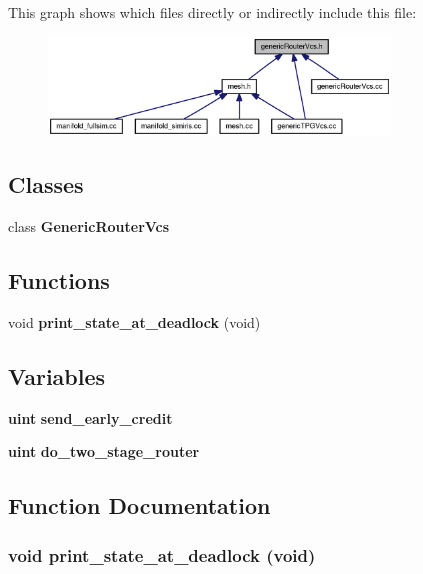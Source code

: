 This graph shows which files directly or indirectly include this file:\nopagebreak
\begin{figure}[H]
\begin{center}
\leavevmode
\includegraphics[width=257pt]{genericRouterVcs_8h__dep__incl}
\end{center}
\end{figure}
\subsection*{Classes}
\begin{CompactItemize}
\item 
class {\bf GenericRouterVcs}
\end{CompactItemize}
\subsection*{Functions}
\begin{CompactItemize}
\item 
void {\bf print\_\-state\_\-at\_\-deadlock} (void)
\end{CompactItemize}
\subsection*{Variables}
\begin{CompactItemize}
\item 
{\bf uint} {\bf send\_\-early\_\-credit}
\item 
{\bf uint} {\bf do\_\-two\_\-stage\_\-router}
\end{CompactItemize}


\subsection{Function Documentation}
\subsubsection[{print\_\-state\_\-at\_\-deadlock}]{\setlength{\rightskip}{0pt plus 5cm}void print\_\-state\_\-at\_\-deadlock (void)}\label{genericRouterVcs_8h_dd8eeaa0833d2f96796f0ee0f0e98f5c}




